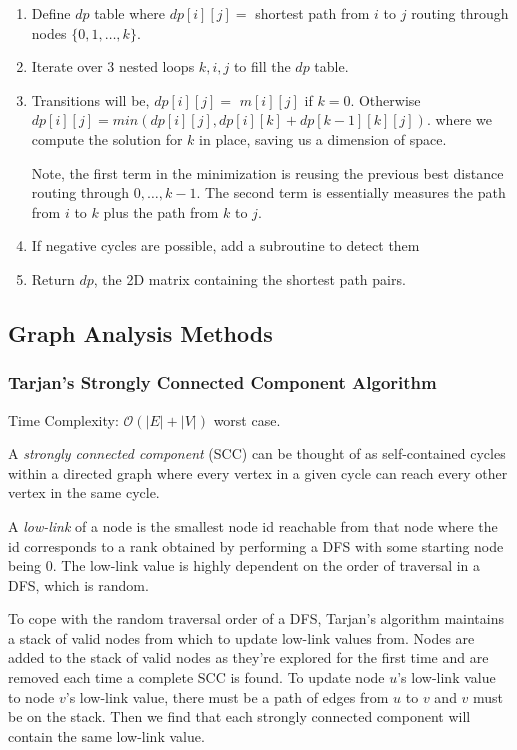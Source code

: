 \documentclass{article}
\newcommand{\bigO}{\mathcal{O}}
\begin{document}
    \begin{enumerate}
        \item Define $dp$ table where $dp[i][j] =$ shortest path from $i$ to $j$ routing through nodes $\{ 0, 1, \dots, k \}$.
    
        \item Iterate over 3 nested loops $k,i,j$ to fill the $dp$ table.
        
        \item Transitions will be, $dp[i][j] =$ $m[i][j]$ if $k = 0$. Otherwise $dp[i][j] = min(dp[i][j], dp[i][k] + dp[k-1][k][j])$. where we compute the solution for $k$ in place, saving us a  dimension of space.
        
        Note, the first term in the minimization is reusing the previous best distance routing through $0, \dots, k-1$. The second term is essentially measures the path from $i$ to $k$ plus the path from $k$ to $j$. 
        
        \item If negative cycles are possible, add a subroutine to detect them
        
        \item Return $dp$, the 2D matrix containing the shortest path pairs.
    \end{enumerate}
     
    \subsection{Graph Analysis Methods}
    \subsubsection{Tarjan's Strongly Connected Component Algorithm}
    Time Complexity: $\bigO (|E| + |V|)$ worst case.
    
    A \textit{strongly connected component} (SCC) can be thought of as self-contained cycles within a directed graph where every vertex in a given cycle can reach every other vertex in the same cycle. 
    
    A \textit{low-link} of a node is the smallest node id reachable from that node where the id corresponds to a rank obtained by performing a DFS with some starting node being 0. The low-link value is highly dependent on the order of traversal in a DFS, which is random.
    
    To cope with the random traversal order of a DFS, Tarjan's algorithm maintains a stack of valid nodes from which to update low-link values from. Nodes are added to the stack of valid nodes as they're explored for the first time and are removed each time a complete SCC is found. To update node $u$'s low-link value to node $v$'s low-link value, there must be a path of edges from $u$ to $v$ and $v$ must be on the stack. Then we find that each strongly connected component will contain the same low-link value. 
    
\end{document}
